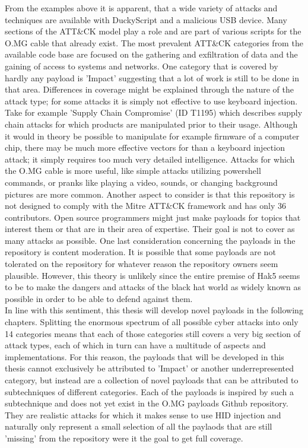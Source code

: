 From the examples above it is apparent, that a wide variety of attacks and techniques are available with DuckyScript and a malicious USB device. Many sections of the ATT\&CK model play a role and are part of various scripts for the O.MG cable that already exist. The most prevalent ATT\&CK categories from the available code base are focused on the gathering and exfiltration of data and the gaining of access to systems and networks. One category that is covered by hardly any payload is 'Impact' suggesting that a lot of work is still to be done in that area.
Differences in coverage might be explained through the nature of the attack type; for some attacks it is simply not effective to use keyboard injection. Take for example 'Supply Chain Compromise' (ID T1195) which describes supply chain attacks for which products are manipulated prior to their usage. Although it would in theory be possible to manipulate for example firmware of a computer chip, there may be much more effective vectors for than a keyboard injection attack; it simply requires too much very detailed intelligence. Attacks for which the O.MG cable is more useful, like simple attacks utilizing powershell commands, or pranks like playing a video, sounds, or changing background pictures are more common. 
Another aspect to consider is that this repository is not designed to comply with the Mitre ATT\&CK framework and has only 36 contributors. Open source programmers might just make payloads for topics that interest them or that are in their area of expertise. Their goal is not to cover as many attacks as possible. One last consideration concerning the payloads in the repository is content moderation. It is possible that some payloads are not tolerated on the repository for whatever reason the repository owners seem plausible. However, this theory is unlikely since the entire premise of Hak5 seems to be to make the dangers and attacks of the black hat world as widely known as possible in order to be able to defend against them.\\  
In line with this sentiment, this thesis will develop novel payloads in the following chapters. Splitting the enormous spectrum of all possible cyber attacks into only 14 categories means that each of those categories still covers a very big section of attack types, each of which in turn can have a multitude of aspects and implementations. For this reason, the payloads that will be developed in this thesis cannot exclusively be attributed to 'Impact' or another underrepresented category, but instead are a collection of novel payloads that can be attributed to subtechniques of different categories. Each of the payloads is inspired by such a subtechnique and does not yet exist in the O.MG payloads Github repository. They are realistic attacks for which it makes sense to use HID injection and naturally only represent a small selection of all the paylaods that are still 'missing' from the repository were it the goal to get full coverage. 


